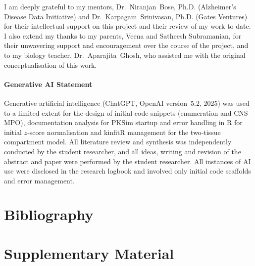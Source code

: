 \documentclass[times, twoside]{zHenriquesLab-StyleBioRxiv}
\begin{document}
		
		\begin{acknowledgements}
			I am deeply grateful to my mentors, Dr.~Niranjan~Bose, Ph.D. (Alzheimer’s Disease Data Initiative) and Dr.~Karpagam~Srinivasan, Ph.D. (Gates Ventures) for their intellectual support on this project and their review of my work to date.  I also extend my thanks to my parents, Veena and Satheesh Subramanian, for their unwavering support and encouragement over the course of the project, and to my biology teacher, Dr.~Aparajita~Ghosh, who assisted me with the original conceptualisation of this work.
			
			\paragraph{Generative AI Statement}
			Generative artificial intelligence (ChatGPT, OpenAI version~5.2, 2025) was used to a limited extent for the design of initial code snippets (enumeration and CNS MPO), documentation analysis for PKSim startup and error handling in R for initial $z$‑score normalisation and kinfitR management for the two‑tissue compartment model.  All literature review and synthesis was independently conducted by the student researcher, and all ideas, writing and revision of the abstract and paper were performed by the student researcher.  All instances of AI use were disclosed in the research logbook and involved only initial code scaffolds and error management.
		\end{acknowledgements}
		
		\section*{Bibliography}
       
		
		\onecolumn
		\newpage
		
		\captionsetup*{format=largeformat}
		\section{Supplementary Material}
\end{document}
